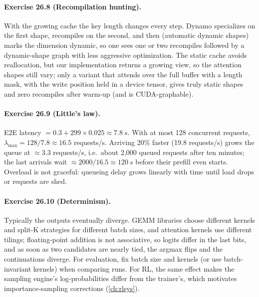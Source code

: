 \paragraph{Exercise 26.8 (Recompilation hunting).}
With the growing cache the key length changes every step. Dynamo specializes on the first shape,
recompiles on the second, and then (automatic dynamic shapes) marks the dimension dynamic, so one sees
one or two recompiles followed by a dynamic-shape graph with less aggressive optimization. The static
cache avoids reallocation, but our implementation returns a growing view, so the attention shapes still
vary; only a variant that attends over the full buffer with a length mask, with the write position held
in a device tensor, gives truly static shapes and zero recompiles after warm-up (and is CUDA-graphable).

\paragraph{Exercise 26.9 (Little's law).}
E2E latency $=0.3+299\times0.025\approx\SI{7.8}{s}$. With at most 128 concurrent requests,
$\lambda_{\max}=128/7.8\approx16.5$ requests/s. Arriving 20\% faster (19.8 requests/s) grows the queue at
$\approx3.3$ requests/s, i.e.\ about 2,000 queued requests after ten minutes; the last arrivals wait
$\approx2000/16.5\approx\SI{120}{s}$ before their prefill even starts. Overload is not graceful: queueing delay
grows linearly with time until load drops or requests are shed.

\paragraph{Exercise 26.10 (Determinism).}
Typically the outputs eventually diverge. GEMM libraries choose different kernels and split-K strategies
for different batch sizes, and attention kernels use different tilings; floating-point addition is not
associative, so logits differ in the last bits, and as soon as two candidates are nearly tied, the argmax
flips and the continuations diverge. For evaluation, fix batch size and kernels (or use
batch-invariant kernels) when comparing runs. For RL, the same effect makes the sampling engine's
log-probabilities differ from the trainer's, which motivates importance-sampling corrections (\cref{ch:rlsys}).
